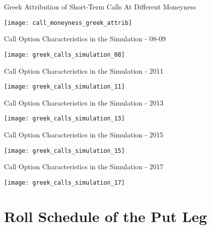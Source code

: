 \documentclass{beamer}
\begin{document}
\begin{frame}{Greek Attribution of Short-Term Calls At Different Moneyness}

\texttt{[image: call\_moneyness\_greek\_attrib]}

\end{frame}



\begin{frame}{Call Option Characteristics in the Simulation - 08-09}

\texttt{[image: greek\_calls\_simulation\_08]}

\end{frame}


\begin{frame}{Call Option Characteristics in the Simulation - 2011}

\texttt{[image: greek\_calls\_simulation\_11]}

\end{frame}


\begin{frame}{Call Option Characteristics in the Simulation - 2013}

\texttt{[image: greek\_calls\_simulation\_13]}

\end{frame}


\begin{frame}{Call Option Characteristics in the Simulation - 2015}

\texttt{[image: greek\_calls\_simulation\_15]}

\end{frame}




\begin{frame}{Call Option Characteristics in the Simulation - 2017}

\texttt{[image: greek\_calls\_simulation\_17]}

\end{frame}




\section{Roll Schedule of the Put Leg}
\end{document}

